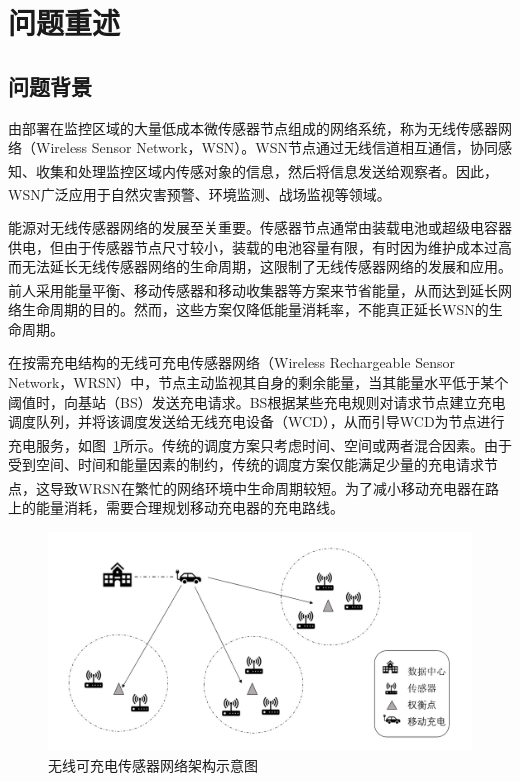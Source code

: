 \documentclass{whutmod}
\newcommand{\upcite}[1]{\textsuperscript{\cite{#1}}}
\begin{document}
    \thispagestyle{empty}
    \tableofcontents
    \setcounter{page}{0}
    \newpage

    \section{问题重述}
        \subsection{问题背景}
            由部署在监控区域的大量低成本微传感器节点组成的网络系统，称为无线传感器网络（Wireless Sensor Network，WSN）。WSN节点通过无线信道相互通信，协同感知、收集和处理监控区域内传感对象的信息，然后将信息发送给观察者\upcite{1}。因此，WSN广泛应用于自然灾害预警、环境监测、战场监视等领域\upcite{2}。

            能源对无线传感器网络的发展至关重要。传感器节点通常由装载电池或超级电容器供电，但由于传感器节点尺寸较小，装载的电池容量有限，有时因为维护成本过高而无法延长无线传感器网络的生命周期，这限制了无线传感器网络的发展和应用。前人采用能量平衡\upcite{4,5}、移动传感器\upcite{6,7}和移动收集器等方案来节省能量，从而达到延长网络生命周期的目的。然而，这些方案仅降低能量消耗率，不能真正延长WSN的生命周期。

            在按需充电结构的无线可充电传感器网络（Wireless Rechargeable Sensor Network，WRSN）中，节点主动监视其自身的剩余能量，当其能量水平低于某个阈值时，向基站（BS）发送充电请求。BS根据某些充电规则对请求节点建立充电调度队列，并将该调度发送给无线充电设备（WCD），从而引导WCD为节点进行充电服务\upcite{3}，如图~\ref{lasbel}所示。传统的调度方案只考虑时间、空间或两者混合因素。由于受到空间、时间和能量因素的制约，传统的调度方案仅能满足少量的充电请求节点，这导致WRSN在繁忙的网络环境中生命周期较短\upcite{3}。为了减小移动充电器在路上的能量消耗，需要合理规划移动充电器的充电路线。

            \begin{figure}[H]
                \centering
                \includegraphics[width=\textwidth]{figures/demo.png}
                \caption{无线可充电传感器网络架构示意图}\label{lasbel}
            \end{figure}
\end{document}
